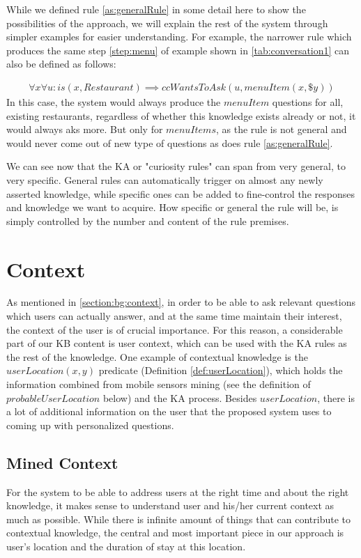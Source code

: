 While we defined rule \ref{as:generalRule} in some detail here to show the 
possibilities of the approach, we will explain the rest of the system through 
simpler examples for easier understanding. For example, the narrower rule which
produces the same step \ref{step:menu} of example shown in 
\autoref{tab:conversation1} can also be defined as follows:

\begin{equation}\label{as:specificRule}
\begin{gathered}
\forall x \forall u:is(x,Restaurant) \implies ccWantsToAsk(u,menuItem(x,\$y))
\end{gathered}
\end{equation}
In this case, the system would always produce the $menuItem$ questions for all, 
existing restaurants, regardless of whether this knowledge exists already or
not, it would always aks more. But only for $menuItems$, as the rule is not
general and would never come out of new type of questions as does rule 
\ref{as:generalRule}.

We can see now that the KA or "curiosity rules" can span from very general, to 
very specific. General rules can automatically trigger on almost any newly 
asserted knowledge, while specific ones can be added to fine-control the 
responses and knowledge we want to acquire. How specific or general the rule 
will be, is simply controlled by the number and content of the rule premises.

\section{Context}
\label{section:context}
As mentioned in \autoref{section:bg:context}, in order to be able to ask 
relevant questions which users can actually answer, and at the same time 
maintain their interest, the context of the user is of crucial importance. For 
this reason, a considerable part of our KB content is user context, which can 
be used with the KA rules as the rest of the knowledge. One example of 
contextual knowledge is the $userLocation(x,y)$ predicate 
(Definition \ref{def:userLocation}), which holds the information combined from 
mobile 
sensors mining (see the definition of $probableUserLocation$ below) and the KA 
process. Besides $userLocation$, there is a lot of additional information on the
user that the proposed system uses to coming up with personalized questions.

\subsection{Mined Context}
\label{section:minedContext}
For the system to be able to address users at the right time and about the right
knowledge, it makes sense to understand user and his/her current context as
much as possible. While there is infinite amount of things that can contribute
to contextual knowledge, the central and most important piece in our 
approach is user's location and the duration of stay at this location. 

